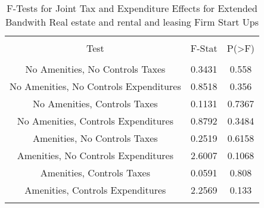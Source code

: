 
\begin{table}[!htbp] \centering 
  \caption{F-Tests for Joint Tax and Expenditure Effects for Extended Bandwith Real estate and rental and leasing Firm Start Ups} 
  \label{53Ftests} 
\begin{tabular}{@{\extracolsep{5pt}} ccc} 
\\[-1.8ex]\hline 
\hline \\[-1.8ex] 
Test & F-Stat & P(\textgreater F) \\ 
\hline \\[-1.8ex] 
No Amenities, No Controls Taxes & 0.3431 & 0.558 \\ 
No Amenities, No Controls Expenditures & 0.8518 & 0.356 \\ 
No Amenities, Controls Taxes & 0.1131 & 0.7367 \\ 
No Amenities, Controls Expenditures & 0.8792 & 0.3484 \\ 
Amenities, No Controls Taxes & 0.2519 & 0.6158 \\ 
Amenities, No Controls Expenditures & 2.6007 & 0.1068 \\ 
Amenities, Controls Taxes & 0.0591 & 0.808 \\ 
Amenities, Controls Expenditures & 2.2569 & 0.133 \\ 
\hline \\[-1.8ex] 
\end{tabular} 
\end{table} 
